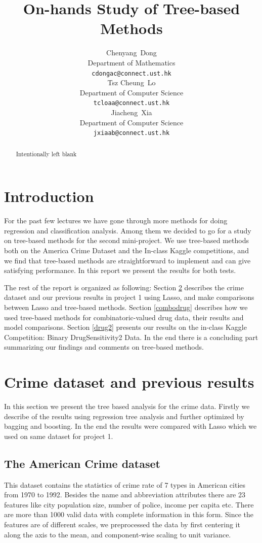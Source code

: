 \documentclass{article}
\title{On-hands Study of Tree-based Methods}
\author{
  Chenyang~Dong\\
  Department of Mathematics\\
  \texttt{cdongac@connect.ust.hk} \\
  \And
  Tsz Cheung~Lo\\
   Department of Computer Science\\
  \texttt{tcloaa@connect.ust.hk} \\
  \And
  Jiacheng~Xia\\
   Department of Computer Science\\
  \texttt{jxiaab@connect.ust.hk} \\
}
\begin{document}

\maketitle

\begin{abstract}
Intentionally left blank
\end{abstract}

\section{Introduction}

For the past few lectures we have gone through more methods for doing regression and classification analysis. Among them we decided to go for a study on tree-based methods for the second mini-project. We use tree-based methods both on the America Crime Dataset and the In-class Kaggle competitions, and we find that tree-based methods are straightforward to implement and can give satisfying performance. In this report we present the results for both tests.

The rest of the report is organized as following: Section \ref{crime-Lasso} describes the crime dataset and our previous results in project 1 using Lasso, and make comparisons between Lasso and tree-based methods. Section \ref{combodrug} describes how we used tree-based methods for combinatoric-valued drug data, their results and model comparisons. Section \ref{drug2} presents our results on the in-class Kaggle Competition: Binary DrugSensitivity2 Data. In the end there is a concluding part summarizing our findings and comments on tree-based methods.

\section{Crime dataset and previous results}
\label{crime-Lasso}
In this section we present the tree based analysis for the crime data. Firstly we describe of the results using regression tree analysis and further optimized by bagging and boosting. In the end the results were compared with Lasso which we used on same dataset for project 1.

\subsection{The American Crime dataset}
\label{crime_data}
This dataset contains the statistics of crime rate of 7 types in American cities from 1970 to 1992. Besides the name and abbreviation attributes there are 23 features like city population size, number of police, income per capita etc. There are more than 1000 valid data with complete information in this form. Since the features are of different scales, we preprocessed the data by first centering it along the axis to the mean, and component-wise scaling to unit variance.
\end{document}
